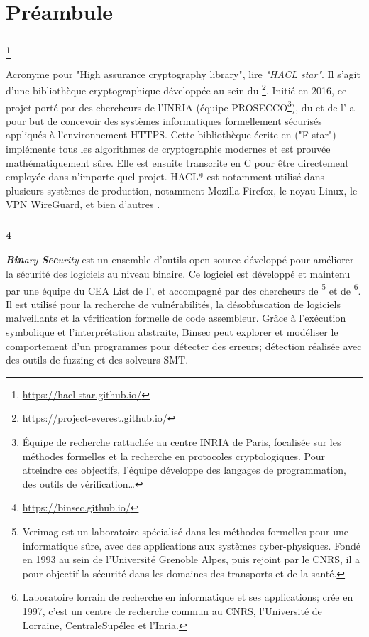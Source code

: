 \chapter*{Préambule}
\label{chap:prelude}


\subsection*{ \footnote{\url{https://hacl-star.github.io/}}}
Acronyme pour "High assurance cryptography library", lire \textit{"HACL star"}. Il s'agit d'une bibliothèque cryptographique développée au sein du \textbf{}\footnote{\url{https://project-everest.github.io/}}. Initié en 2016, ce projet porté par des chercheurs de l'INRIA (équipe PROSECCO\footnote{Équipe de recherche rattachée au centre INRIA de Paris, focalisée sur les méthodes formelles et la recherche en protocoles cryptologiques. Pour atteindre ces objectifs, l'équipe développe des langages de programmation, des outils de vérification\dots}), du  et de l' a pour but de concevoir des systèmes informatiques formellement sécurisés appliqués à l'environnement HTTPS. Cette bibliothèque écrite en  ("F star") implémente tous les algorithmes de cryptographie modernes et est prouvée mathématiquement sûre. Elle est ensuite transcrite en C pour être directement employée dans n'importe quel projet. HACL* est notamment utilisé dans plusieurs systèmes de production, notamment Mozilla Firefox, le noyau Linux, le VPN WireGuard, et bien d'autres \etc.


\subsection*{ \footnote{\url{https://binsec.github.io/}}}
\textit{\textbf{Bin}ary \textbf{Sec}urity} est un ensemble d'outils open source développé pour améliorer la sécurité des logiciels au niveau binaire. Ce logiciel est développé et maintenu par une équipe du CEA List de l', et accompagné par des chercheurs de \footnote{Verimag est un laboratoire spécialisé dans les méthodes formelles pour une informatique sûre, avec des applications aux systèmes cyber-physiques. Fondé en 1993 au sein de l'Université Grenoble Alpes, puis rejoint par le CNRS, il a pour objectif la sécurité dans les domaines des transports et de la santé.} et de \footnote{Laboratoire lorrain de recherche en informatique et ses applications; crée en 1997, c'est un centre de recherche commun au CNRS, l'Université de Lorraine, CentraleSupélec et l'Inria.}. Il est utilisé pour la recherche de vulnérabilités, la désobfuscation de logiciels malveillants et la vérification formelle de code assembleur. Grâce à l'exécution symbolique et l'interprétation abstraite, Binsec peut explorer et modéliser le comportement d'un programmes pour détecter des erreurs; détection réalisée avec des outils de fuzzing et des solveurs SMT.
